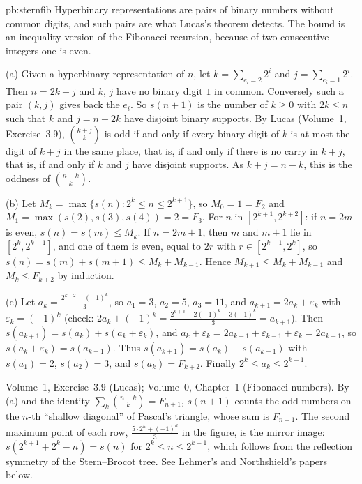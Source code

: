 \begin{solution}{pb:sternfib}
\idea Hyperbinary representations are pairs of binary numbers without common digits, and such pairs are what Lucas's theorem
detects. The bound is an inequality version of the Fibonacci recursion, because of two consecutive integers one is even.

\writeup (a) Given a hyperbinary representation of $n$, let $k=\sum_{e_i=2}2^i$ and $j=\sum_{e_i=1}2^i$. Then $n=2k+j$ and $k$, $j$
have no binary digit $1$ in common. Conversely such a pair $(k,j)$ gives back the $e_i$. So $s(n+1)$ is the number of $k\ge0$
with $2k\le n$ such that $k$ and $j=n-2k$ have disjoint binary supports. By Lucas (Volume~1, Exercise~3.9), $\binom{k+j}k$ is odd if
and only if every binary digit of $k$ is at most the digit of $k+j$ in the same place, that is, if and only if there is no carry in
$k+j$, that is, if and only if $k$ and $j$ have disjoint supports. As $k+j=n-k$, this is the oddness of $\binom{n-k}k$.

(b) Let $M_k=\max\{s(n):2^k\le n\le2^{k+1}\}$, so $M_0=1=F_2$ and $M_1=\max(s(2),s(3),s(4))=2=F_3$. For $n$ in $[2^{k+1},2^{k+2}]$: if
$n=2m$ is even, $s(n)=s(m)\le M_k$. If $n=2m+1$, then $m$ and $m+1$ lie in $[2^k,2^{k+1}]$, and one of them is even, equal to $2r$
with $r\in[2^{k-1},2^k]$, so $s(n)=s(m)+s(m+1)\le M_k+M_{k-1}$. Hence $M_{k+1}\le M_k+M_{k-1}$ and $M_k\le F_{k+2}$ by induction.

(c) Let $a_k=\frac{2^{k+2}-(-1)^k}3$, so $a_1=3$, $a_2=5$, $a_3=11$, and $a_{k+1}=2a_k+\varepsilon_k$ with $\varepsilon_k=(-1)^k$ (check:
$2a_k+(-1)^k=\frac{2^{k+3}-2(-1)^k+3(-1)^k}3=a_{k+1}$). Then $s(a_{k+1})=s(a_k)+s(a_k+\varepsilon_k)$, and
$a_k+\varepsilon_k=2a_{k-1}+\varepsilon_{k-1}+\varepsilon_k=2a_{k-1}$, so $s(a_k+\varepsilon_k)=s(a_{k-1})$. Thus $s(a_{k+1})=s(a_k)+s(a_{k-1})$ with
$s(a_1)=2$, $s(a_2)=3$, and $s(a_k)=F_{k+2}$. Finally $2^k\le a_k\le2^{k+1}$.

\tools Volume~1, Exercise~3.9 (Lucas); Volume~0, Chapter~1 (Fibonacci numbers).
\leads By (a) and the identity $\sum_k\binom{n-k}k=F_{n+1}$, $s(n+1)$ counts the odd numbers on the $n$-th ``shallow diagonal''
of Pascal's triangle, whose sum is $F_{n+1}$. The second maximum point of each row, $\frac{5\cdot2^k+(-1)^k}3$ in the figure, is the
mirror image: $s(2^{k+1}+2^k-n)=s(n)$ for $2^k\le n\le2^{k+1}$, which follows from the reflection symmetry of the Stern--Brocot tree.
See Lehmer's and Northshield's papers below.
\end{solution}

